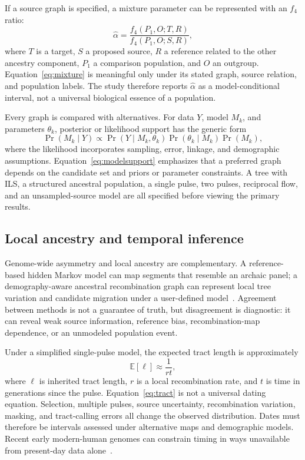 \documentclass[conference]{IEEEtran}
\begin{document}
If a source graph is specified, a mixture parameter can be represented with an $f_4$ ratio:
\begin{equation}
\label{eq:mixture}
\widehat{\alpha}=\frac{f_4(P_1,O;T,R)}{f_4(P_1,O;S,R)},
\end{equation}
where $T$ is a target, $S$ a proposed source, $R$ a reference related to the other ancestry component, $P_1$ a comparison population, and $O$ an outgroup. Equation~\eqref{eq:mixture} is meaningful only under its stated graph, source relation, and population labels. The study therefore reports $\widehat{\alpha}$ as a model-conditional interval, not a universal biological essence of a population.

Every graph is compared with alternatives. For data $Y$, model $M_k$, and parameters $\theta_k$, posterior or likelihood support has the generic form
\begin{equation}
\label{eq:modelsupport}
\Pr(M_k\mid Y)\propto \Pr(Y\mid M_k,\theta_k)\Pr(\theta_k\mid M_k)\Pr(M_k),
\end{equation}
where the likelihood incorporates sampling, error, linkage, and demographic assumptions. Equation~\eqref{eq:modelsupport} emphasizes that a preferred graph depends on the candidate set and priors or parameter constraints. A tree with ILS, a structured ancestral population, a single pulse, two pulses, reciprocal flow, and an unsampled-source model are all specified before viewing the primary results.

\subsection{Local ancestry and temporal inference}

Genome-wide asymmetry and local ancestry are complementary. A reference-based hidden Markov model can map segments that resemble an archaic panel; a demography-aware ancestral recombination graph can represent local tree variation and candidate migration under a user-defined model~\cite{hubisz2020,schaefer2021}. Agreement between methods is not a guarantee of truth, but disagreement is diagnostic: it can reveal weak source information, reference bias, recombination-map dependence, or an unmodeled population event.

Under a simplified single-pulse model, the expected tract length is approximately
\begin{equation}
\label{eq:tract}
\mathbb{E}[\ell]\approx\frac{1}{r t},
\end{equation}
where $\ell$ is inherited tract length, $r$ is a local recombination rate, and $t$ is time in generations since the pulse. Equation~\eqref{eq:tract} is not a universal dating equation. Selection, multiple pulses, source uncertainty, recombination variation, masking, and tract-calling errors all change the observed distribution. Dates must therefore be intervals assessed under alternative maps and demographic models. Recent early modern-human genomes can constrain timing in ways unavailable from present-day data alone~\cite{sumer2024}.
\end{document}
